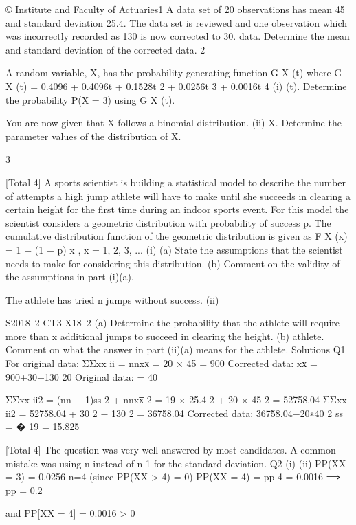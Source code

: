 © Institute and Faculty of Actuaries1
A data set of 20 observations has mean 45 and standard deviation 25.4. The data set is
reviewed and one observation which was incorrectly recorded as 130 is now corrected
to 30.
data.
Determine the mean and standard deviation of the corrected data.
2

A random variable, X, has the probability generating function G X (t) where
G X (t) = 0.4096 + 0.4096t + 0.1528t 2 + 0.0256t 3 + 0.0016t 4
(i)
(t).
Determine the probability P(X = 3) using G X (t).

You are now given that X follows a binomial distribution.
(ii)
X.
Determine the parameter values of the distribution of X.

3

[Total 4]
A sports scientist is building a statistical model to describe the number of attempts
a high jump athlete will have to make until she succeeds in clearing a certain height
for the first time during an indoor sports event. For this model the scientist considers
a geometric distribution with probability of success p. The cumulative distribution
function of the geometric distribution is given as
F X (x) = 1 − (1 − p) x , x = 1, 2, 3, ...
(i)
(a) State the assumptions that the scientist needs to make for considering
this distribution.
(b) Comment on the validity of the assumptions in part (i)(a). 

The athlete has tried n jumps without success.
(ii)

S2018–2
CT3 X18–2
(a) Determine the probability that the athlete will require more than x
additional jumps to succeed in clearing the height.
(b) athlete. 
Comment on what the answer in part (ii)(a) means for the athlete.
Solutions
Q1
For original data: ΣΣxx ii = nnxx̅ = 20 × 45 = 900
Corrected data:
xx̅ =
900+30−130
20
Original data:
= 40

ΣΣxx ii2 = (nn − 1)ss 2 + nnxx̅ 2 = 19 × 25.4 2 + 20 × 45 2 = 52758.04 
ΣΣxx ii2 = 52758.04 + 30 2 − 130 2 = 36758.04 
Corrected data:
36758.04−20∗40 2
ss = �
19
= 15.825

[Total 4]
The question was very well answered by most candidates. A common
mistake was using n instead of n-1 for the standard deviation.
Q2
(i)
(ii)
PP(XX = 3) = 0.0256
n=4 (since PP(XX > 4) = 0)
PP(XX = 4) = pp 4 = 0.0016
⟹ pp = 0.2

and PP[XX = 4] = 0.0016 > 0




